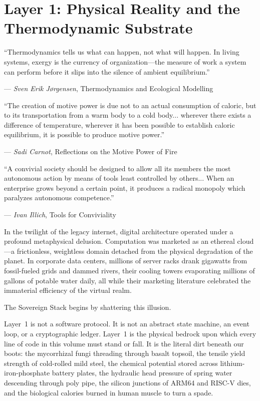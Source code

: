 \chapter[Layer 1: Physical Infrastructure]{Layer 1: Physical Reality and the Thermodynamic Substrate}
\label{chap:layer1_physical}

\epigraph{
    ``Thermodynamics tells us what can happen, not what will happen. In living systems, exergy is the currency of organization---the measure of work a system can perform before it slips into the silence of ambient equilibrium.''
}{--- \textit{Sven Erik J{\o}rgensen}, \textnormal{Thermodynamics and Ecological Modelling} \parencite{jorgensen2001thermodynamics}}

\epigraph{
    ``The creation of motive power is due not to an actual consumption of caloric, but to its transportation from a warm body to a cold body... wherever there exists a difference of temperature, wherever it has been possible to establish caloric equilibrium, it is possible to produce motive power.''
}{--- \textit{Sadi Carnot}, \textnormal{Reflections on the Motive Power of Fire} \parencite{carnot1824}}

\epigraph{
    ``A convivial society should be designed to allow all its members the most autonomous action by means of tools least controlled by others... When an enterprise grows beyond a certain point, it produces a radical monopoly which paralyzes autonomous competence.''
}{--- \textit{Ivan Illich}, \textnormal{Tools for Conviviality} \parencite{illich1973}}

In the twilight of the legacy internet, digital architecture operated under a profound metaphysical delusion. Computation was marketed as an ethereal cloud---a frictionless, weightless domain detached from the physical degradation of the planet. In corporate data centers, millions of server racks drank gigawatts from fossil-fueled grids and dammed rivers, their cooling towers evaporating millions of gallons of potable water daily, all while their marketing literature celebrated the immaterial efficiency of the virtual realm.

The Sovereign Stack begins by shattering this illusion.

Layer~1 is not a software protocol. It is not an abstract state machine, an event loop, or a cryptographic ledger. Layer~1 is the physical bedrock upon which every line of code in this volume must stand or fall. It is the literal dirt beneath our boots: the mycorrhizal fungi threading through basalt topsoil, the tensile yield strength of cold-rolled mild steel, the chemical potential stored across lithium-iron-phosphate battery plates, the hydraulic head pressure of spring water descending through poly pipe, the silicon junctions of ARM64 and RISC-V dies, and the biological calories burned in human muscle to turn a spade.

